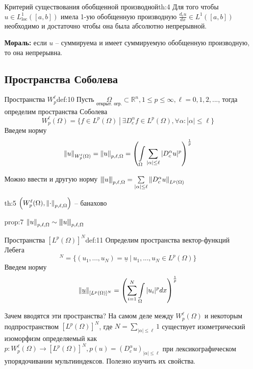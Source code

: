 \documentclass[12pt,a4paper]{article}
\newcommand{\intset}[1]{\int\limits_{#1}}
\newcommand{\Real}{\mathbb{R}}
\newcommand{\nnorm}[1]{{\left\vert\kern-0.25ex\left\vert\kern-0.25ex\left\vert #1 
		\right\vert\kern-0.25ex\right\vert\kern-0.25ex\right\vert}}
\begin{document}
\begin{theorem}{Критерий существования обобщенной производной}{th:4}
	Для того чтобы $u \in L_{\text{loc}}^1 ([a, b])$ имела 1-ую обобщенную производную $\frac{d_c u}{dx} \in L^1 ([a, b])$ необходимо и достаточно чтобы она была абсолютно непрерывной.
\end{theorem}
\textbf{Мораль:} если $u$ -- суммируема и имеет суммируемую обобщенную производную, то она непрерывна.

\subsection{Пространства Соболева}

\begin{definition}{Пространства $W_p^\ell$}{def:10}
	Пусть $\underset{\text{открыт. огр.}}{\Omega} \subset \Real^n, 1 \leq p \leq \infty, \ell = 0, 1, 2, ...$, тогда определим пространства Соболева
	\begin{equation*}
	 	W_p^\ell (\Omega) = \{f \in L^p (\Omega) \ | \ \exists D_c^\alpha f \in L^p (\Omega), \forall \alpha: |\alpha| \leq \ell\}
	\end{equation*}
	Введем норму
	\begin{equation*}
		\norm{u}_{W_p^\ell (\Omega)} = \norm{u}_{p, \ell, \Omega} = \left( \intset{\Omega}{\sum\limits_{|\alpha| \leq \ell}{|D_c^\alpha u|^p}} \right)^{\frac{1}{p}}
	\end{equation*}
\end{definition}
Можно ввести и другую норму $\nnorm{u}_{p, \ell, \Omega} = \sum\limits_{|\alpha| \leq \ell}{\norm{D_c^\alpha u}_{L^p (\Omega)}}$

\begin{theorem}{}{th:5}
	$\left(W_p^\ell (\Omega), \norm{\cdot}_{p, \ell, \Omega}\right)$ -- банахово
\end{theorem}

\begin{proposition}{}{prop:7}
	$\norm{u}_{p, \ell, \Omega} \sim \nnorm{u}_{p, \ell, \Omega}$
\end{proposition}

\begin{definition}{Пространства $[L^p (\Omega)]^N$}{def:11}
	Определим пространства вектор-функций Лебега
	\begin{equation*}
		[L^p (\Omega)]^N = \{(u_1, ..., u_N) = \underline{u} \ | \ u_1, ..., u_N \in L^p (\Omega)\} 
	\end{equation*}
	Введем норму
	\begin{equation*}
		\norm{\underline{u}}_{[L^p (\Omega)]^N} = \left(\sum\limits_{i=1}^{N}{\intset{\Omega}{|u_i|^p dx}}\right)^{\frac{1}{p}}
	\end{equation*}
\end{definition}
Зачем вводятся эти пространства? На самом деле между $W_p^\ell (\Omega)$ и некоторым подпространством $[L^p (\Omega)]^N$, где $N = \sum\limits_{|\alpha| \leq \ell}{1}$ существует изометрический изоморфизм определяемый как $p: W_p^\ell (\Omega) \to [L^p (\Omega)]^N, p(u) = (D_c^\alpha u)_{|\alpha| \leq \ell}$ при лексикографическом упорядочивании мультииндексов. Полезно изучить их свойства.
\end{document}
